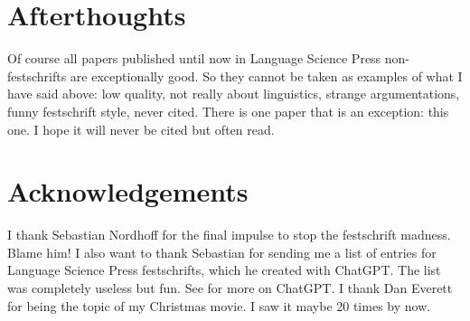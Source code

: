 \documentclass[output=paper,colorlinks,citecolor=brown]{langscibook}
\begin{document}
  


\section*{Afterthoughts}

Of course all papers published until now in Language Science Press non\hyp fest\-schrifts are exceptionally good. So they
cannot be taken as examples of what I have said above: low quality, not really about linguistics,
strange argumentations, funny festschrift style, never cited. There is one paper that is an
exception: this one. I hope it will never be cited but often read.

\section*{Acknowledgements}

I thank Sebastian Nordhoff for the final impulse to stop the festschrift madness. Blame him! I also
want to thank Sebastian for sending me a list of  entries for Language Science Press
festschrifts, which he created with ChatGPT. The list was completely useless but fun. See
 for more on ChatGPT. I thank
Dan Everett for being the topic of my Christmas movie. I saw it maybe 20 times by now.




{\sloppy\printbibliography[heading=subbibliography,notkeyword=this]}
\end{document}
